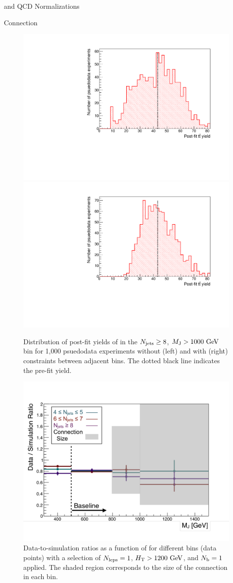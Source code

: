 \begin{section}{\ttbar and QCD Normalizations}
\begin{subsection}{\MJ Connection}
\begin{figure}[tbp!]
\centering
\includegraphics[angle=0,width=0.48\columnwidth]{fig/mj_exps_noconn.pdf}
\includegraphics[angle=0,width=0.48\columnwidth]{fig/mj_exps_conn.pdf}
\caption{Distribution of post-fit yields of \ttbar in the $N_{\mathrm{jets}} \geq 8$, $M_{\mathrm{J}} > 1000~\mathrm{Ge\kern -0.1em V}$ bin for 1,000 psuedodata experiments without (left) and with (right) constraints between adjacent \MJ bins.
The dotted black line indicates the pre-fit yield.}
\label{fig:mj_connection_exps}
\end{figure}

\begin{figure}[tbp!]
\centering
\includegraphics[angle=0,width=0.60\columnwidth]{fig/mj_connection.pdf}
\caption{Data-to-simulation ratios as a function of \MJ for different \Njets bins (data points) with a selection of $N_{\mathrm{leps}} = 1$, $H_{\mathrm{T}} > 1200~\mathrm{Ge\kern -0.1em V}$, and $N_{\mathrm{b}} = 1$ applied.
The shaded region corresponds to the size of the \MJ connection in each \MJ bin.}
\label{fig:mj_connection}
\end{figure}

\end{subsection}

\end{section}

